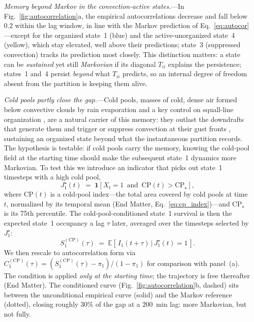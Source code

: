 \documentclass[
    aps,
    prl,
    reprint,
    superscriptaddress,
    amsmath,amssymb,
    floatfix,
    nofootinbib
]{revtex4-2}
\begin{document}
\emph{Memory beyond Markov in the convection-active states.}---In Fig.~\ref{fig:autocorrelation}a, the empirical autocorrelations decrease and fall below $0.2$ within the lag window, in line with the Markov prediction of Eq.~\eqref{eq:autocor}---except for the organized state~1 (blue) and the active-unorganized state~4 (yellow), which stay elevated, well above their predictions; state~3 (suppressed convection) tracks its prediction most closely. This distinction matters: a state can be \emph{sustained} yet still \emph{Markovian} if its diagonal $T_{ii}$ explains the persistence; states~1 and~4 persist \emph{beyond} what $T_{ii}$ predicts, so an internal degree of freedom absent from the partition is keeping them alive.

\emph{Cold pools partly close the gap.}---Cold pools, masses of cold, dense air formed below convective clouds by rain evaporation and a key control on squall-line organization \cite{rotunno1988theory, houze1977structure, tompkins2001coldpools, abramian2022shear}, are a natural carrier of this memory: they outlast the downdrafts that generate them and trigger or suppress convection at their gust fronts \cite{torri2015mechanisms}, sustaining an organized state beyond what the instantaneous partition records. The hypothesis is testable: if cold pools carry the memory, knowing the cold-pool field at the starting time should make the subsequent state~1 dynamics more Markovian. To test this we introduce an indicator that picks out state~1 timesteps with a high cold pool,
\begin{equation}
J_1^\star(t) \;=\; \mathbf{1}\!\left[X_t = 1 \,\text{ and }\, \mathrm{CP}(t) > \mathrm{CP}_\star\right],
\end{equation}
where $\mathrm{CP}(t)$ is a cold-pool index---the total area covered by cold pools at time $t$, normalized by its temporal mean (End Matter, Eq.~\ref{eq:cp_index})---and $\mathrm{CP}_\star$ is its 75th percentile. The cold-pool-conditioned state~1 survival is then the expected state~1 occupancy a lag $\tau$ later, averaged over the timesteps selected by $J_1^\star$:
\begin{equation}
S^{(\mathrm{CP})}_1(\tau) \;=\; \mathbb{E}\!\left[\,I_1(t+\tau) \,\big|\, J_1^\star(t) = 1\,\right].
\end{equation}
We then rescale to autocorrelation form via $C^{(\mathrm{CP})}_1(\tau) = (S^{(\mathrm{CP})}_1(\tau) - \pi_1)/(1-\pi_1)$ for comparison with panel~(a). The condition is applied \emph{only at the starting time}; the trajectory is free thereafter (End Matter). The conditioned curve (Fig.~\ref{fig:autocorrelation}b, dashed) sits between the unconditional empirical curve (solid) and the Markov reference (dotted), closing roughly $30\%$ of the gap at a $200$~min lag: more Markovian, but not fully.
\end{document}
